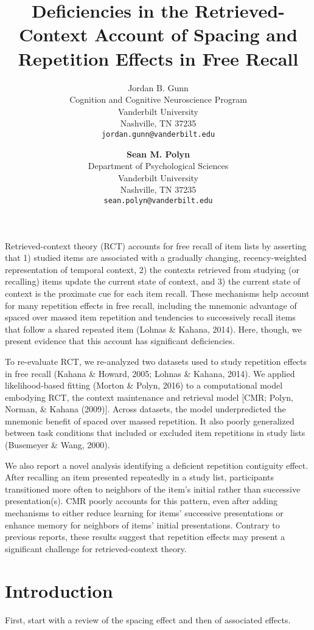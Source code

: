 \documentclass[
  letterpaper,
  DIV=11]{article}
\title{Deficiencies in the Retrieved-Context Account of Spacing and
Repetition Effects in Free Recall}
\author{Jordan B. Gunn\\
Cognition and Cognitive Neuroscience Program\\
Vanderbilt University\\
Nashville, TN 37235\\
\texttt{jordan.gunn@vanderbilt.edu} \and \textbf{Sean M. Polyn}\\
Department of Psychological Sciences\\
Vanderbilt University\\
Nashville, TN 37235\\
\texttt{sean.polyn@vanderbilt.edu}}
\date{}
\begin{document}
\maketitle

Retrieved-context theory (RCT) accounts for free recall of item lists by
asserting that 1) studied items are associated with a gradually
changing, recency-weighted representation of temporal context, 2) the
contexts retrieved from studying (or recalling) items update the current
state of context, and 3) the current state of context is the proximate
cue for each item recall. These mechanisms help account for many
repetition effects in free recall, including the mnemonic advantage of
spaced over massed item repetition and tendencies to successively recall
items that follow a shared repeated item (Lohnas \& Kahana, 2014). Here,
though, we present evidence that this account has significant
deficiencies.

To re-evaluate RCT, we re-analyzed two datasets used to study repetition
effects in free recall (Kahana \& Howard, 2005; Lohnas \& Kahana, 2014).
We applied likelihood-based fitting (Morton \& Polyn, 2016) to a
computational model embodying RCT, the context maintenance and retrieval
model {[}CMR; Polyn, Norman, \& Kahana (2009){]}. Across datasets, the
model underpredicted the mnemonic benefit of spaced over massed
repetition. It also poorly generalized between task conditions that
included or excluded item repetitions in study lists (Busemeyer \& Wang,
2000).

We also report a novel analysis identifying a deficient repetition
contiguity effect. After recalling an item presented repeatedly in a
study list, participants transitioned more often to neighbors of the
item's initial rather than successive presentation(s). CMR poorly
accounts for this pattern, even after adding mechanisms to either reduce
learning for items' successive presentations or enhance memory for
neighbors of items' initial presentations. Contrary to previous reports,
these results suggest that repetition effects may present a significant
challenge for retrieved-context theory.

\hypertarget{introduction}{%
\section{Introduction}\label{introduction}}

First, start with a review of the spacing effect and then of associated
effects.
\end{document}
